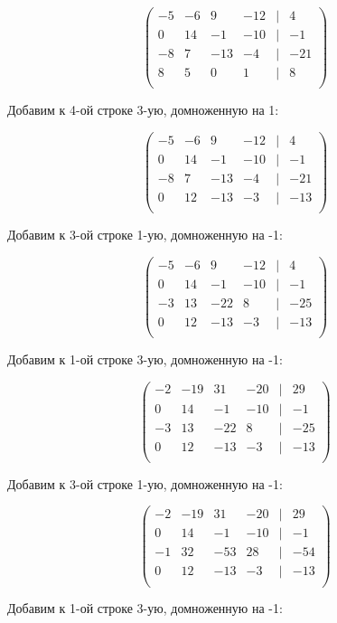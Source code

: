	\[
	\begin{pmatrix}
	-5 & -6 & 9 & -12 & | & 4 \\
	0 & 14 & -1 & -10 & | & -1 \\
	-8 & 7 & -13 & -4 & | & -21 \\
	8 & 5 & 0 & 1 & | & 8 \\
	\end{pmatrix}
	\]
	
	Добавим к 4-ой строке 3-ую, домноженную на 1:
	
	\[
	\begin{pmatrix}
	-5 & -6 & 9 & -12 & | & 4 \\
	0 & 14 & -1 & -10 & | & -1 \\
	-8 & 7 & -13 & -4 & | & -21 \\
	0 & 12 & -13 & -3 & | & -13 \\
	\end{pmatrix}
	\]
	
	Добавим к 3-ой строке 1-ую, домноженную на -1:
	
	\[
	\begin{pmatrix}
	-5 & -6 & 9 & -12 & | & 4 \\
	0 & 14 & -1 & -10 & | & -1 \\
	-3 & 13 & -22 & 8 & | & -25 \\
	0 & 12 & -13 & -3 & | & -13 \\
	\end{pmatrix}
	\]
	
	Добавим к 1-ой строке 3-ую, домноженную на -1:
	
	\[
	\begin{pmatrix}
	-2 & -19 & 31 & -20 & | & 29 \\
	0 & 14 & -1 & -10 & | & -1 \\
	-3 & 13 & -22 & 8 & | & -25 \\
	0 & 12 & -13 & -3 & | & -13 \\
	\end{pmatrix}
	\]
	
	Добавим к 3-ой строке 1-ую, домноженную на -1:
	
	\[
	\begin{pmatrix}
	-2 & -19 & 31 & -20 & | & 29 \\
	0 & 14 & -1 & -10 & | & -1 \\
	-1 & 32 & -53 & 28 & | & -54 \\
	0 & 12 & -13 & -3 & | & -13 \\
	\end{pmatrix}
	\]
	
	Добавим к 1-ой строке 3-ую, домноженную на -1:
	

